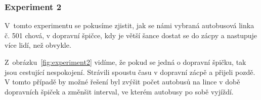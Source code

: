 \documentclass[a4paper]{article}
\begin{document}
            \subsubsection{Experiment 2}
            \label{subsubsec:experiment2}

                V~tomto experimentu se pokusíme zjistit, jak se námi vybraná autobusová linka č. 501 chová, v dopravní špičce, kdy je větší šance dostat se do zácpy a nastupuje více lidí, než obvykle. 

                \begin{table}[H]
                    \centering
                    \caption{Parametry experimentu 2}
                    \label{tab:experiment2}
                \end{table}

                Z~obrázku~\ref{fig:experiment2} vidíme, že pokud se jedná o dopravní špičku, tak jsou cestující nespokojení. Strávili spoustu času v dopravní zácpě a přijeli pozdě. V tomto případě by možné řešení byl zvýšit počet autobusů na lince v době dopravních špiček a změnšit interval, ve kterém autobusy po sobě vyjíždí.
\end{document}
